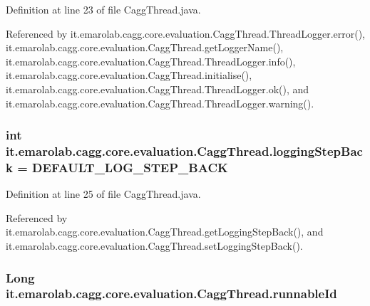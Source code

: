 Definition at line 23 of file Cagg\-Thread.\-java.



Referenced by it.\-emarolab.\-cagg.\-core.\-evaluation.\-Cagg\-Thread.\-Thread\-Logger.\-error(), it.\-emarolab.\-cagg.\-core.\-evaluation.\-Cagg\-Thread.\-get\-Logger\-Name(), it.\-emarolab.\-cagg.\-core.\-evaluation.\-Cagg\-Thread.\-Thread\-Logger.\-info(), it.\-emarolab.\-cagg.\-core.\-evaluation.\-Cagg\-Thread.\-initialise(), it.\-emarolab.\-cagg.\-core.\-evaluation.\-Cagg\-Thread.\-Thread\-Logger.\-ok(), and it.\-emarolab.\-cagg.\-core.\-evaluation.\-Cagg\-Thread.\-Thread\-Logger.\-warning().

\hypertarget{classit_1_1emarolab_1_1cagg_1_1core_1_1evaluation_1_1CaggThread_a1cee6eb33e519f65885ddb3a5ab6515f}{
\subsubsection[{logging\-Step\-Back}]{\setlength{\rightskip}{0pt plus 5cm}int it.\-emarolab.\-cagg.\-core.\-evaluation.\-Cagg\-Thread.\-logging\-Step\-Back = {\bf D\-E\-F\-A\-U\-L\-T\-\_\-\-L\-O\-G\-\_\-\-S\-T\-E\-P\-\_\-\-B\-A\-C\-K}\hspace{0.3cm}{\ttfamily [private]}}}\label{classit_1_1emarolab_1_1cagg_1_1core_1_1evaluation_1_1CaggThread_a1cee6eb33e519f65885ddb3a5ab6515f}


Definition at line 25 of file Cagg\-Thread.\-java.



Referenced by it.\-emarolab.\-cagg.\-core.\-evaluation.\-Cagg\-Thread.\-get\-Logging\-Step\-Back(), and it.\-emarolab.\-cagg.\-core.\-evaluation.\-Cagg\-Thread.\-set\-Logging\-Step\-Back().

\hypertarget{classit_1_1emarolab_1_1cagg_1_1core_1_1evaluation_1_1CaggThread_a47118bd7dad8aedaf8b1d5d4b296b5d2}{
\subsubsection[{runnable\-Id}]{\setlength{\rightskip}{0pt plus 5cm}Long it.\-emarolab.\-cagg.\-core.\-evaluation.\-Cagg\-Thread.\-runnable\-Id\hspace{0.3cm}{\ttfamily [private]}}}\label{classit_1_1emarolab_1_1cagg_1_1core_1_1evaluation_1_1CaggThread_a47118bd7dad8aedaf8b1d5d4b296b5d2}


